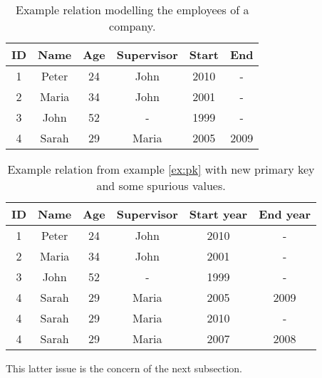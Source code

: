 
\begin{table}
\centering
\caption{Example relation modelling the employees of a company.}
\begin{tabular}{c c c c c c }
\hline
\textbf{ID} & \textbf{Name} & \textbf{Age} & \textbf{Supervisor} & \textbf{Start} & \textbf{End} \\ \hline
1 & Peter & 24 & John &  2010 & - \\
2 & Maria & 34 & John & 2001 & - \\
3 & John & 52 & - &  1999 & - \\
4 & Sarah & 29 & Maria &  2005 & 2009 \\
\hline 
\end{tabular}
\label{table:example-database}



\end{table}




\begin{table}
\centering
\caption{Example relation from example \ref{ex:pk} with new primary key and some spurious values.}
\begin{tabular}{c c c c c c }
\hline
\textbf{ID} & \textbf{Name} & \textbf{Age} & \textbf{Supervisor} & \textbf{Start year} & \textbf{End year} \\ \hline
1 & Peter & 24 & John &  2010 & - \\
2 & Maria & 34 & John & 2001 & - \\
3 & John & 52 & - &  1999 & - \\
4 & Sarah & 29 & Maria &  2005 & 2009 \\
4 & Sarah & 29 & Maria &  2010 & - \\
4 & Sarah & 29 & Maria &  2007 & 2008 \\
\hline 
\end{tabular}
\label{table:example-database-with-new-pk}



\end{table}

This latter issue is the concern of the next subsection.

